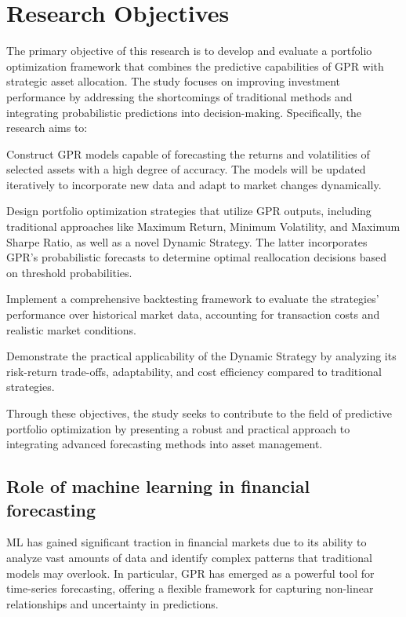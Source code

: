 \section{Research Objectives}
The primary objective of this research is to develop and evaluate a portfolio optimization framework that combines the predictive capabilities of GPR with strategic asset allocation. The study focuses on improving investment performance by addressing the shortcomings of traditional methods and integrating probabilistic predictions into decision-making. Specifically, the research aims to:

Construct \ac{GPR} models capable of forecasting the returns and volatilities of selected assets with a high degree of accuracy. The models will be updated iteratively to incorporate new data and adapt to market changes dynamically.

Design portfolio optimization strategies that utilize \ac{GPR} outputs, including traditional approaches like Maximum Return, Minimum Volatility, and Maximum Sharpe Ratio, as well as a novel Dynamic Strategy. The latter incorporates \ac{GPR}'s probabilistic forecasts to determine optimal reallocation decisions based on threshold probabilities.

Implement a comprehensive backtesting framework to evaluate the strategies' performance over historical market data, accounting for transaction costs and realistic market conditions.

Demonstrate the practical applicability of the Dynamic Strategy by analyzing its risk-return trade-offs, adaptability, and cost efficiency compared to traditional strategies.

Through these objectives, the study seeks to contribute to the field of predictive portfolio optimization by presenting a robust and practical approach to integrating advanced forecasting methods into asset management.

\subsection{Role of machine learning in financial forecasting}
\ac{ML} has gained significant traction in financial markets due to its ability to analyze vast amounts of data and identify complex patterns that traditional models may overlook.
In particular, \ac{GPR} has emerged as a powerful tool for time-series forecasting, offering a flexible framework for capturing non-linear relationships and uncertainty in predictions.

